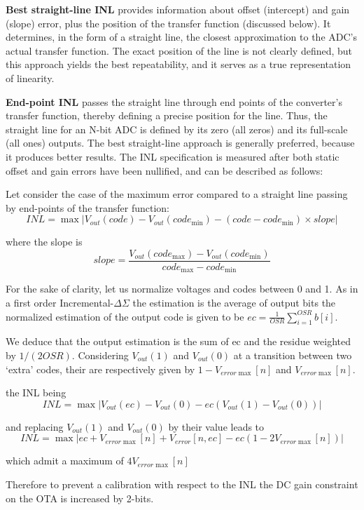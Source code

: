 \textbf{Best straight-line INL} provides information about offset (intercept) and gain (slope) error, plus the position of the transfer function (discussed below). It determines, in the form of a straight line, the closest approximation to the ADC's actual transfer function. The exact position of the line is not clearly defined, but this approach yields the best repeatability, and it serves as a true representation of linearity.

\textbf{End-point INL} passes the straight line through end points of the converter's transfer function, thereby defining a precise position for the line. Thus, the straight line for an N-bit ADC is defined by its zero (all zeros) and its full-scale (all ones) outputs.
The best straight-line approach is generally preferred, because it produces better results. The INL specification is measured after both static offset and gain errors have been nullified, and can be described as follows:

Let consider the case of the maximum error compared to a straight line passing by end-points of the transfer function:
\begin{equation}
    INL = \max \left| V_{out}(code)-V_{out}(code_{\min}) - (code-code_{\min}) \times slope  \right|
\end{equation}

where the slope is 
\begin{equation}
    slope = \frac{V_{out}(code_{\max})-V_{out}(code_{\min})}{code_{\max}-code_{\min}}
\end{equation}

For the sake of clarity, let us normalize voltages and codes between 0 and 1. As in a first order Incremental-\(\Delta\Sigma \) the estimation is the average of output bits the normalized estimation of the output code is given to be \(ec = \frac{1}{OSR}\sum_{i=1}^{OSR} b[i] \). 

We deduce that the output estimation is the sum of ec and the residue weighted by \(1/(2 OSR)\).  Considering \(V_{out}(1) \) and \(V_{out}(0) \) at a transition between two `extra' codes, their are respectively given by \(1-V_{error\max}[n] \) and \(V_{error\max}[n] \).

the INL being
\begin{equation}
    INL = \max \left| V_{out}(ec)-V_{out}(0) - ec (V_{out}(1)-V_{out}(0))  \right|
\end{equation}

and replacing \(V_{out}(1) \) and \(V_{out}(0)\) by their value leads to
\begin{equation}
    INL = \max \left| ec + V_{error\max } [n] + V_{error}[n, ec] - ec (1 - 2 V_{error\max }[n])  \right|
\end{equation}

which admit a maximum of \(4 V_{error\max }[n] \)

Therefore to prevent a calibration with respect to the INL the DC gain constraint on the OTA is increased by 2-bits.
